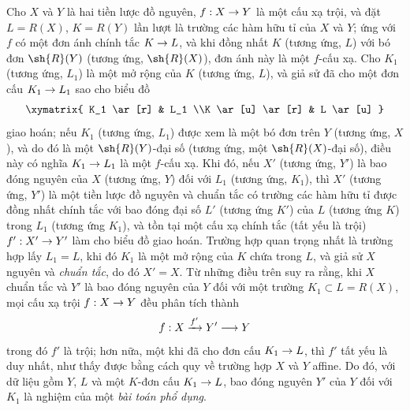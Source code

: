 \documentclass[oneside,10pt]{amsart}
\makeatletter
\newcommand{\ega@arrow}[2]{\mathchoice{#1}{#2}{#2}{#2}}
\renewcommand{\to}{\ega@arrow{\longrightarrow}{\rightarrow}}
\newcommand{\oldpage}[2][]{\marginnote{\normalfont\footnotesize\textbf{#1}~|~#2}\ignorespaces}
\let\EGAOriginalLabel\label
\renewcommand{\label}[1]{\phantomsection\EGAOriginalLabel{#1}}
\makeatother
\begin{document}
\begin{env}[6.3.9]
\label{II.6.3.9}
Cho $X$ và $Y$ là hai tiền lược đồ nguyên, $f:X\to Y$ là một cấu xạ trội, và đặt $L=R(X)$, $K=R(Y)$ lần lượt là trường các hàm hữu tỉ của $X$ và $Y$;
ứng với $f$ có một đơn ánh chính tắc $K\to L$, và khi đồng nhất $K$ (tương ứng, $L$) với bó đơn $\sh{R}(Y)$ (tương ứng, $\sh{R}(X)$), đơn ánh này là một $f$-cấu xạ.
Cho $K_1$ (tương ứng, $L_1$) là một mở rộng của $K$ (tương ứng, $L$), và giả sử đã cho một đơn cấu $K_1\to L_1$ sao cho biểu đồ
\[
  \xymatrix{
    K_1 \ar[r]
    & L_1
  \\K \ar[u] \ar[r]
    & L \ar[u]
  }
\]
giao hoán;
nếu $K_1$ (tương ứng, $L_1$) được xem là một bó đơn trên $Y$ (tương ứng, $X$), và do đó là một $\sh{R}(Y)$-đại số (tương ứng, một $\sh{R}(X)$-đại số), điều này có nghĩa $K_1\to L_1$ là một $f$-cấu xạ.
Khi đó, nếu $X'$ (tương ứng, $Y'$) là bao đóng nguyên của $X$ (tương ứng, $Y$) đối với $L_1$ (tương ứng, $K_1$), thì $X'$ (tương ứng, $Y'$) là một tiền lược đồ nguyên và chuẩn tắc  có trường các hàm hữu tỉ được đồng nhất chính tắc với bao đóng đại số
\oldpage[II]{120}
$L'$ (tương ứng $K'$) của $L$ (tương ứng $K$) trong $L_1$ (tương ứng $K_1$), và tồn tại một cấu xạ chính tắc (tất yếu là trội) $f':X'\to Y'$ làm cho biểu đồ  giao hoán.
Trường hợp quan trọng nhất là trường hợp lấy $L_1=L$, khi đó $K_1$ là một mở rộng của $K$ chứa trong $L$, và giả sử $X$ nguyên và \emph{chuẩn tắc}, do đó $X'=X$.
Từ những điều trên suy ra rằng, khi $X$ chuẩn tắc và $Y'$ là bao đóng nguyên của $Y$ đối với một trường $K_1\subset L=R(X)$, mọi cấu xạ trội $f:X\to Y$ đều phân tích thành
\[
  f:X\xrightarrow{f'}Y'\to Y
\]
trong đó $f'$ là trội;
hơn nữa, một khi đã cho đơn cấu $K_1\to L$, thì $f'$ tất yếu là duy nhất, như thấy được bằng cách quy về trường hợp $X$ và $Y$ affine.
Do đó, với dữ liệu gồm $Y$, $L$ và một $K$-đơn cấu $K_1\to L$, bao đóng nguyên $Y'$ của $Y$ đối với $K_1$ là nghiệm của một \emph{bài toán phổ dụng}.
\end{env}
\end{document}

